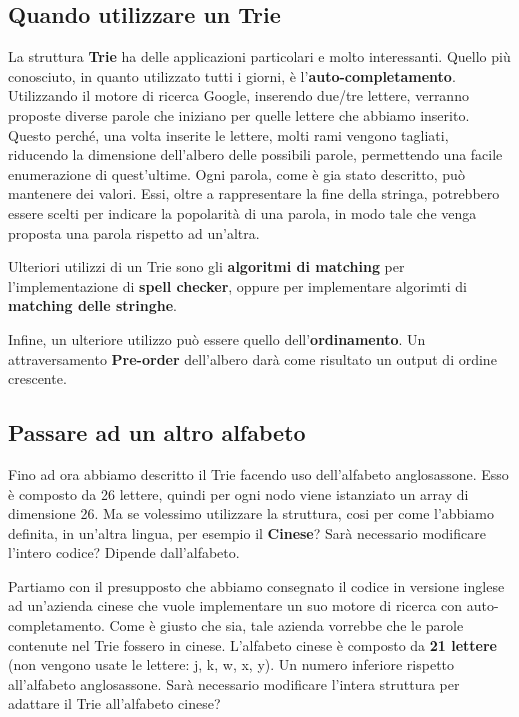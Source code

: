\documentclass[a4paper, 12pt]{article}
\begin{document}
\subsection{Quando utilizzare un Trie}
La struttura \textbf{Trie} ha delle applicazioni particolari e molto interessanti. Quello più conosciuto, in quanto utilizzato tutti i giorni, è l'\textbf{auto-completamento}. Utilizzando il motore di ricerca Google, inserendo due/tre lettere, verranno proposte diverse parole che iniziano per quelle lettere che abbiamo inserito. Questo perché, una volta inserite le lettere, molti rami vengono tagliati, riducendo la dimensione dell'albero delle possibili parole, permettendo una facile enumerazione di quest'ultime. Ogni parola, come è gia stato descritto, può mantenere dei valori. Essi, oltre a rappresentare la fine della stringa, potrebbero essere scelti per indicare la popolarità di una parola, in modo tale che venga proposta una parola rispetto ad un'altra.

Ulteriori utilizzi di un Trie sono gli \textbf{algoritmi di matching} per l'implementazione di \textbf{spell checker}, oppure per implementare algorimti di \textbf{matching delle stringhe}.

Infine, un ulteriore utilizzo può essere quello dell'\textbf{ordinamento}. Un attraversamento \textbf{Pre-order} dell'albero darà come risultato un output di ordine crescente.

\subsection{Passare ad un altro alfabeto}
Fino ad ora abbiamo descritto il Trie facendo uso dell'alfabeto anglosassone. Esso è composto da 26 lettere, quindi per ogni nodo viene istanziato un array di dimensione 26. Ma se volessimo utilizzare la struttura, cosi per come l'abbiamo definita, in un'altra lingua, per esempio il \textbf{Cinese}? Sarà necessario modificare l'intero codice? Dipende dall'alfabeto. 

Partiamo con il presupposto che abbiamo consegnato il codice in versione inglese ad un'azienda cinese che vuole implementare un suo motore di ricerca con auto-completamento. Come è giusto che sia, tale azienda vorrebbe che le parole contenute nel Trie fossero in cinese. L'alfabeto cinese è composto da \textbf{21 lettere} (non vengono usate le lettere: j, k, w, x, y). Un numero inferiore rispetto all'alfabeto anglosassone. Sarà necessario modificare l'intera struttura per adattare il Trie all'alfabeto cinese? 
\end{document}
